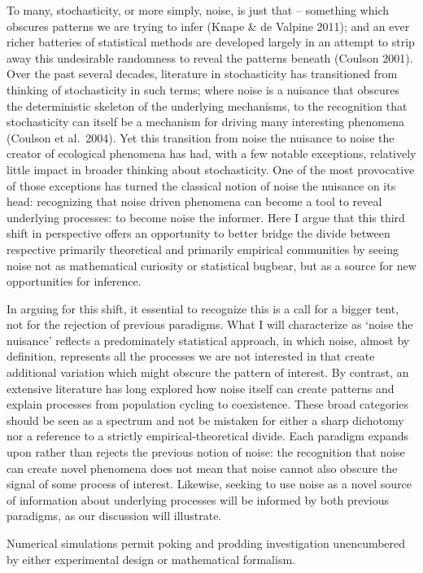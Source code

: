 \documentclass[
  authoryear,
  preprint]{elsarticle}
\begin{document}
To many, stochasticity, or more simply, noise, is just that -- something
which obscures patterns we are trying to infer (Knape \& de Valpine
2011); and an ever richer batteries of statistical methods are developed
largely in an attempt to strip away this undesirable randomness to
reveal the patterns beneath (Coulson 2001). Over the past several
decades, literature in stochasticity has transitioned from thinking of
stochasticity in such terms; where noise is a nuisance that obscures the
deterministic skeleton of the underlying mechanisms, to the recognition
that stochasticity can itself be a mechanism for driving many
interesting phenomena (Coulson et al.~2004). Yet this transition from
noise the nuisance to noise the creator of ecological phenomena has had,
with a few notable exceptions, relatively little impact in broader
thinking about stochasticity. One of the most provocative of those
exceptions has turned the classical notion of noise the nuisance on its
head: recognizing that noise driven phenomena can become a tool to
reveal underlying processes: to become noise the informer. Here I argue
that this third shift in perspective offers an opportunity to better
bridge the divide between respective primarily theoretical and primarily
empirical communities by seeing noise not as mathematical curiosity or
statistical bugbear, but as a source for new opportunities for
inference.

In arguing for this shift, it essential to recognize this is a call for
a bigger tent, not for the rejection of previous paradigms. What I will
characterize as `noise the nuisance' reflects a predominately
statistical approach, in which noise, almost by definition, represents
all the processes we are not interested in that create additional
variation which might obscure the pattern of interest. By contrast, an
extensive literature has long explored how noise itself can create
patterns and explain processes from population cycling to coexistence.
These broad categories should be seen as a spectrum and not be mistaken
for either a sharp dichotomy nor a reference to a strictly
empirical-theoretical divide. Each paradigm expands upon rather than
rejects the previous notion of noise: the recognition that noise can
create novel phenomena does not mean that noise cannot also obscure the
signal of some process of interest. Likewise, seeking to use noise as a
novel source of information about underlying processes will be informed
by both previous paradigms, as our discussion will illustrate.

Numerical simulations permit poking and prodding investigation
unencumbered by either experimental design or mathematical formalism.
\end{document}
